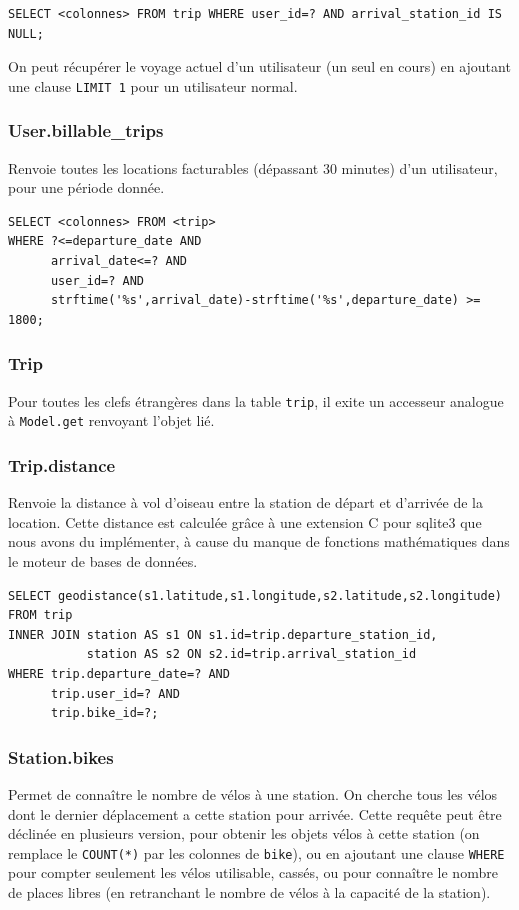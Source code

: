 \documentclass[a4paper,10pt]{article}
\begin{document}
\begin{lstlisting}
SELECT <colonnes> FROM trip WHERE user_id=? AND arrival_station_id IS NULL;
\end{lstlisting}

On peut récupérer le voyage actuel d'un utilisateur (un seul en cours) en ajoutant
une clause \lstinline{LIMIT 1} pour un utilisateur normal.

\subsubsection{User.billable\_trips}
Renvoie toutes les locations facturables (dépassant 30 minutes) d'un utilisateur,
pour une période donnée.

\begin{lstlisting}
SELECT <colonnes> FROM <trip>
WHERE ?<=departure_date AND
      arrival_date<=? AND
      user_id=? AND
      strftime('%s',arrival_date)-strftime('%s',departure_date) >= 1800;
\end{lstlisting}

\subsubsection{Trip}
Pour toutes les clefs étrangères dans la table \texttt{trip}, il exite un
accesseur analogue à \texttt{Model.get} renvoyant l'objet lié.

\subsubsection{Trip.distance}
Renvoie la distance à vol d'oiseau entre la station de départ et d'arrivée de
la location. Cette distance est calculée grâce à une extension C pour sqlite3 que
nous avons du implémenter, à cause du manque de fonctions mathématiques dans le
moteur de bases de données.

\begin{lstlisting}
SELECT geodistance(s1.latitude,s1.longitude,s2.latitude,s2.longitude)
FROM trip
INNER JOIN station AS s1 ON s1.id=trip.departure_station_id,
           station AS s2 ON s2.id=trip.arrival_station_id
WHERE trip.departure_date=? AND
      trip.user_id=? AND
      trip.bike_id=?;
\end{lstlisting}


\subsubsection{Station.bikes}
Permet de connaître le nombre de vélos à une station. On cherche tous les vélos
dont le dernier déplacement a cette station pour arrivée. Cette requête peut être
déclinée en plusieurs version, pour obtenir les objets vélos à cette station (on
remplace le \lstinline{COUNT(*)} par les colonnes de \texttt{bike}), ou en ajoutant
une clause \lstinline{WHERE} pour compter seulement les vélos utilisable, cassés, ou
pour connaître le nombre de places libres (en retranchant le nombre de vélos à
la capacité de la station).
\end{document}
